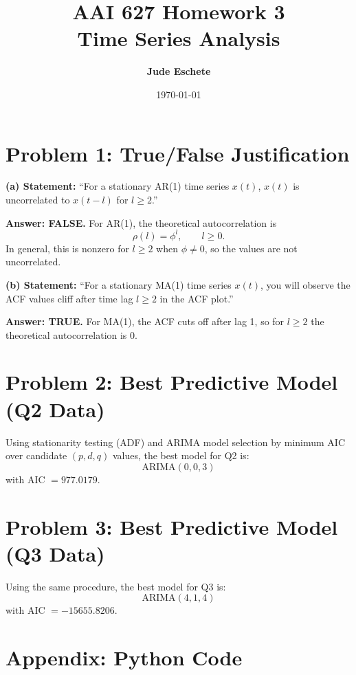 \documentclass[12pt]{article}
\title{\textbf{AAI 627 Homework 3\\Time Series Analysis}}
\author{\textbf{Jude Eschete}}
\date{\today}
\begin{document}
	
	\maketitle

	\section{Problem 1: True/False Justification}

	\textbf{(a) Statement:} ``For a stationary AR(1) time series $x(t)$, $x(t)$ is uncorrelated to $x(t-l)$ for $l\geq 2$.''

	\textbf{Answer: FALSE.} For AR(1), the theoretical autocorrelation is
	\[
	\rho(l)=\phi^l,\qquad l\geq 0.
	\]
	In general, this is nonzero for $l\geq 2$ when $\phi\neq 0$, so the values are not uncorrelated.

	\vspace{0.75em}
	\textbf{(b) Statement:} ``For a stationary MA(1) time series $x(t)$, you will observe the ACF values cliff after time lag $l\geq 2$ in the ACF plot.''

	\textbf{Answer: TRUE.} For MA(1), the ACF cuts off after lag 1, so for $l\geq2$ the theoretical autocorrelation is 0.

	\newpage
	\section{Problem 2: Best Predictive Model (Q2 Data)}

	Using stationarity testing (ADF) and ARIMA model selection by minimum AIC over candidate $(p,d,q)$ values, the best model for Q2 is:
	\[
	\boxed{\text{ARIMA}(0,0,3)}
	\]
	with AIC $=977.0179$.

	
	
	\newpage
	\section{Problem 3: Best Predictive Model (Q3 Data)}

	Using the same procedure, the best model for Q3 is:
	\[
	\boxed{\text{ARIMA}(4,1,4)}
	\]
	with AIC $=-15655.8206$.

	

	\newpage
	\section{Appendix: Python Code}
	
	
	
\end{document}
